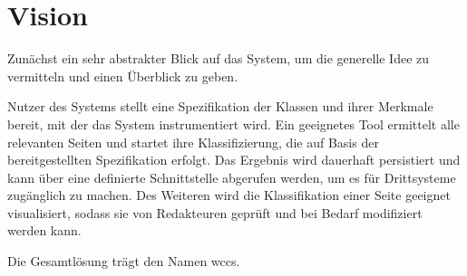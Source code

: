 \section{Vision}
    Zunächst ein sehr abstrakter Blick auf das System,
    um die generelle Idee zu vermitteln und einen Überblick zu geben.

    Nutzer des Systems stellt eine Spezifikation der Klassen und ihrer Merkmale bereit,
    mit der das System instrumentiert wird.
    Ein geeignetes Tool ermittelt alle relevanten Seiten und startet ihre Klassifizierung,
    die auf Basis der bereitgestellten Spezifikation erfolgt.
    Das Ergebnis wird dauerhaft persistiert und kann über eine definierte Schnittstelle
    abgerufen werden, um es für Drittsysteme zugänglich zu machen.
    Des Weiteren wird die Klassifikation einer Seite geeignet visualisiert,
    sodass sie von Redakteuren geprüft und bei Bedarf modifiziert werden kann.

    Die Gesamtlösung trägt den Namen \gls{wccs}.